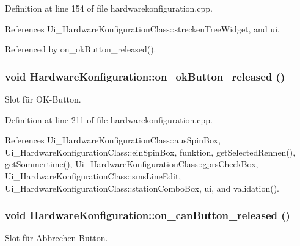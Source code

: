 Definition at line 154 of file hardwarekonfiguration.cpp.

References Ui\_\-HardwareKonfigurationClass::streckenTreeWidget, and ui.

Referenced by on\_\-okButton\_\-released().\hypertarget{class_hardware_konfiguration_eda81840a5d1f60c63eb9898e98dbaf8}{
\subsubsection[on\_\-okButton\_\-released]{\setlength{\rightskip}{0pt plus 5cm}void HardwareKonfiguration::on\_\-okButton\_\-released ()}}
\label{class_hardware_konfiguration_eda81840a5d1f60c63eb9898e98dbaf8}


Slot für OK-Button. 



Definition at line 211 of file hardwarekonfiguration.cpp.

References Ui\_\-HardwareKonfigurationClass::ausSpinBox, Ui\_\-HardwareKonfigurationClass::einSpinBox, funktion, getSelectedRennen(), getSommertime(), Ui\_\-HardwareKonfigurationClass::gprsCheckBox, Ui\_\-HardwareKonfigurationClass::smsLineEdit, Ui\_\-HardwareKonfigurationClass::stationComboBox, ui, and validation().\hypertarget{class_hardware_konfiguration_466e1fc199b46929f823e5ebab041854}{
\subsubsection[on\_\-canButton\_\-released]{\setlength{\rightskip}{0pt plus 5cm}void HardwareKonfiguration::on\_\-canButton\_\-released ()}}
\label{class_hardware_konfiguration_466e1fc199b46929f823e5ebab041854}


Slot für Abbrechen-Button. 



